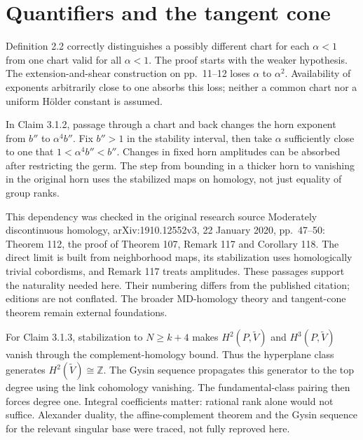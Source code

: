 \documentclass[10pt]{article}
\begin{document}
\section*{Quantifiers and the tangent cone}
Definition 2.2 correctly distinguishes a possibly different chart for each \(\alpha<1\) from one chart valid for all \(\alpha<1\). The proof starts with the weaker hypothesis. The extension-and-shear construction on pp. 11–12 loses \(\alpha\) to \(\alpha^2\). Availability of exponents arbitrarily close to one absorbs this loss; neither a common chart nor a uniform Hölder constant is assumed.\par
In Claim 3.1.2, passage through a chart and back changes the horn exponent from \(b''\) to \(\alpha^4b''\). Fix \(b''>1\) in the stability interval, then take \(\alpha\) sufficiently close to one that \(1<\alpha^4b''<b''\). Changes in fixed horn amplitudes can be absorbed after restricting the germ. The step from bounding in a thicker horn to vanishing in the original horn uses the stabilized maps on homology, not just equality of group ranks.\par
This dependency was checked in the original research source Moderately discontinuous homology, arXiv:1910.12552v3, 22 January 2020, pp. 47–50: Theorem 112, the proof of Theorem 107, Remark 117 and Corollary 118. The direct limit is built from neighborhood maps, its stabilization uses homologically trivial cobordisms, and Remark 117 treats amplitudes. These passages support the naturality needed here. Their numbering differs from the published citation; editions are not conflated. The broader MD-homology theory and tangent-cone theorem remain external foundations.\par
For Claim 3.1.3, stabilization to \(N\geq k+4\) makes \(H^2(P,\widetilde V)\) and \(H^3(P,\widetilde V)\) vanish through the complement-homology bound. Thus the hyperplane class generates \(H^2(\widetilde V)\cong\mathbb Z\). The Gysin sequence propagates this generator to the top degree using the link cohomology vanishing. The fundamental-class pairing then forces degree one. Integral coefficients matter: rational rank alone would not suffice. Alexander duality, the affine-complement theorem and the Gysin sequence for the relevant singular base were traced, not fully reproved here.\par
\end{document}
